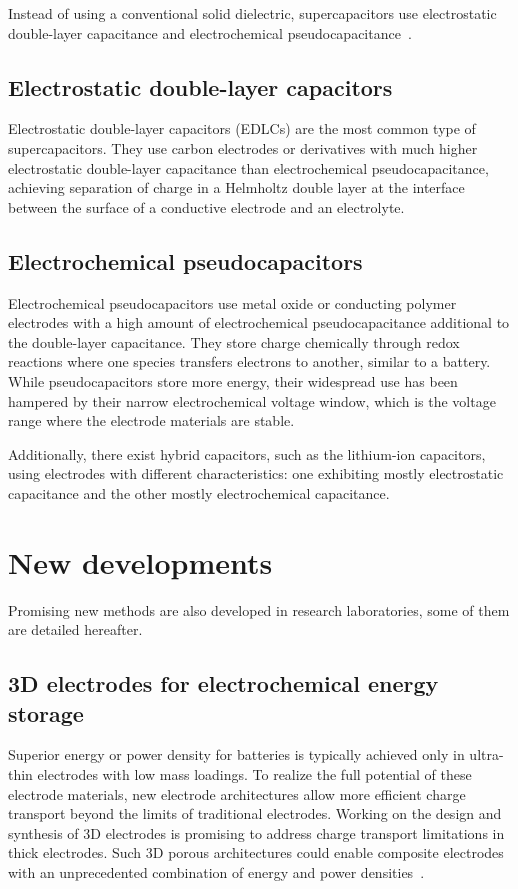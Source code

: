 \documentclass{EPL-master-thesis-covers-EN}
\begin{document}
Instead of using a conventional solid dielectric, supercapacitors use electrostatic double-layer capacitance and electrochemical pseudocapacitance~\cite{2019JPS...414..420B}.

\subsection*{Electrostatic double-layer capacitors}

Electrostatic double-layer capacitors (EDLCs) are the most common type of supercapacitors. They use carbon electrodes or derivatives with much higher electrostatic double-layer capacitance than electrochemical pseudocapacitance, achieving separation of charge in a Helmholtz double layer at the interface between the surface of a conductive electrode and an electrolyte.

\subsection*{Electrochemical pseudocapacitors}

Electrochemical pseudocapacitors use metal oxide or conducting polymer electrodes with a high amount of electrochemical pseudocapacitance additional to the double-layer capacitance. They store charge chemically through redox reactions where one species transfers electrons to another, similar to a battery. While pseudocapacitors store more energy, their widespread use has been hampered by their narrow electrochemical voltage window, which is the voltage range where the electrode materials are stable.

Additionally, there exist hybrid capacitors, such as the lithium-ion capacitors, using electrodes with different characteristics: one exhibiting mostly electrostatic capacitance and the other mostly electrochemical capacitance.

\section{New developments}

Promising new methods are also developed in research laboratories, some of them are detailed hereafter.

\subsection*{3D electrodes for electrochemical energy storage}

Superior energy or power density for batteries is typically achieved only in ultra-thin electrodes with low mass loadings. To realize the full potential of these electrode materials, new electrode architectures allow more efficient charge transport beyond the limits of traditional electrodes. Working on the design and synthesis of 3D electrodes is promising to address charge transport limitations in thick electrodes. Such 3D porous architectures could enable composite electrodes with an unprecedented combination of energy and power densities~\cite{Sun2019}.
\end{document}
